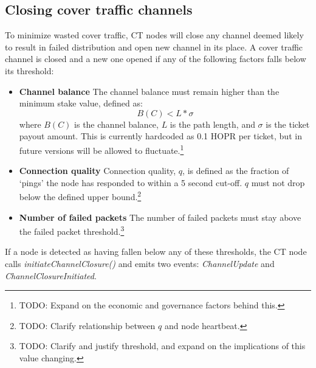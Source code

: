 \subsection{Closing cover traffic channels}
\label{sec:ct:channelclose}

To minimize wasted cover traffic, CT nodes will close any channel deemed likely to result in failed distribution and open new channel in its place. A cover traffic channel is closed and a new one opened if any of the following factors falls below its threshold:

\begin{itemize}
    \item \textbf{Channel balance} The channel balance must remain higher than the minimum stake value, defined as:
          $$B(C) < L * \sigma$$
          where $B(C)$ is the channel balance, $L$ is the path length, and $\sigma$ is the ticket payout amount. This is currently hardcoded as 0.1 HOPR per ticket, but in future versions will be allowed to fluctuate.\footnote{TODO: Expand on the economic and governance factors behind this.}
    \item \textbf{Connection quality} Connection quality, $q$, is defined as the fraction of `pings' the node has responded to within a 5 second cut-off. $q$ must not drop below the defined upper bound.\footnote{TODO: Clarify relationship between $q$ and node heartbeat.}
    \item \textbf{Number of failed packets} The number of failed packets must stay above the failed packet threshold.\footnote{TODO: Clarify and justify threshold, and expand on the implications of this value changing.}
          $$ $$
\end{itemize}

If a node is detected as having fallen below any of these thresholds, the CT node calls \textit{initiateChannelClosure()} and emits two events: \textit{ChannelUpdate} and \textit{ChannelClosureInitiated}.